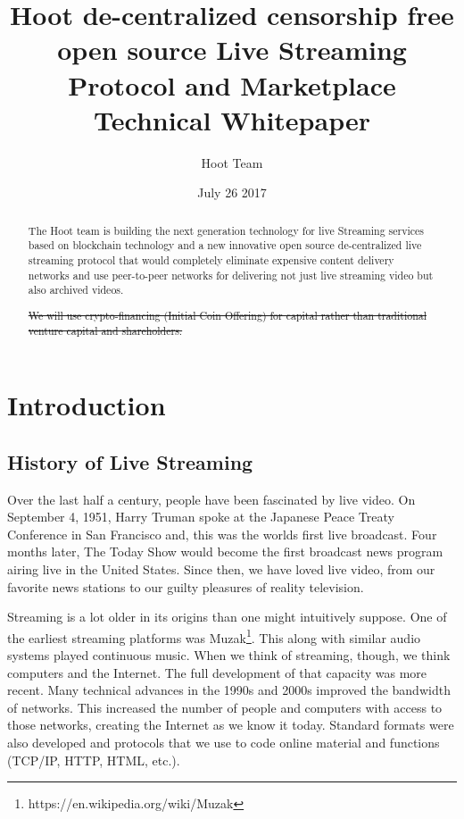 \documentclass{article}
\title{Hoot de-centralized censorship free open source Live Streaming Protocol and Marketplace Technical Whitepaper}
\author{Hoot Team}
\date{July 26 2017}
\begin{document}
\maketitle

\begin{abstract}
The Hoot team is building the next generation technology for live
Streaming services based on blockchain technology and a new
innovative open source de-centralized live streaming protocol that would completely eliminate expensive content delivery networks and use peer-to-peer networks for delivering not just live streaming video but also archived videos.

\sout{We will use crypto-financing (Initial Coin Offering) for capital rather than traditional venture capital and shareholders.}

\end{abstract}
\newpage

\tableofcontents
\newpage

\section{Introduction}
\subsection{History of Live Streaming}
Over the last half a century, people have been fascinated by live video. On September 4, 1951, Harry Truman spoke at the Japanese Peace Treaty Conference in San Francisco and, this was the worlds first live broadcast. Four months later, The Today Show would become the first broadcast news program airing live in the United States. Since then, we have loved live video, from our favorite news stations to our guilty pleasures of reality television.

Streaming is a lot older in its origins than one might intuitively suppose. One of the earliest streaming platforms was Muzak\footnote{https://en.wikipedia.org/wiki/Muzak}. This along with similar audio systems played continuous music. When we think of streaming, though, we think computers and the Internet. The full development of that capacity was more recent. Many technical advances in the 1990s and 2000s improved the bandwidth of networks. This increased the number of people and computers with access to those networks, creating the Internet as we know it today. Standard formats were also developed and protocols that we use to code online material and functions (TCP/IP, HTTP, HTML, etc.).
\end{document}
